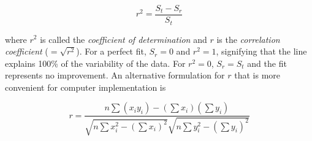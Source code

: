 \documentclass[../main.tex]{subfiles}
\begin{document}
\begin{equation}
	\tag{14.20}
	r^2 = \frac{S_t - S_r}{S_t}
\end{equation}

\noindent where $r^2$ is called the \textit{coefficient of determination} and $r$ is the \textit{correlation coefficient} ($=\sqrt{r^2}$). For a perfect fit, $S_r = 0$ and $r^2 = 1$, signifying that the line explains 100\% of the variability of the data. For $r^2 = 0$, $S_r = S_t$ and the fit represents no improvement. An alternative formulation for $r$ that is more convenient for computer implementation is

\begin{equation}
	\tag{14.21}
	r = \frac{n \sum (x_i y_i) - (\sum x_i) (\sum y_i)}{\sqrt{n \sum x^2_i - (\sum x_i)^2} \sqrt{n \sum y^2_i - (\sum y_i)^2}}
\end{equation}
\end{document}
